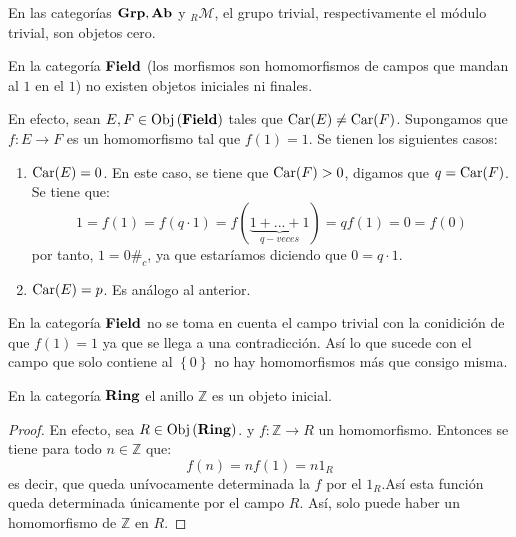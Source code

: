 \documentclass[12pt]{report}
\theoremstyle{largebreak}
\newcommand\cf[3]{\ensuremath{#1:#2\rightarrow#3}}
\newcommand\contradiction{\ensuremath{\#_c}}
\newcommand{\Obj}[1]{\ensuremath{\textup{Obj}\left(#1\right)}}
\newcommand{\Cat}[1]{\ensuremath{\textup{\textbf{#1}}}}
\begin{document}
    \begin{exa}
        En las categorías $\Cat{Grp},\Cat{Ab}$ y $_R\mathcal{M}$, el grupo trivial, respectivamente el módulo trivial, son objetos cero.
    \end{exa}

    \begin{exa}
        En la categoría $\Cat{Field}$ (los morfismos son homomorfismos de campos que mandan al $1$ en el $1$) no existen objetos iniciales ni finales.
    \end{exa}

    \begin{sol}
        En efecto, sean $E,F\in\Obj{\Cat{Field}}$ tales que $\textup{Car}(E)\neq\textup{Car}(F)$. Supongamos que $\cf{f}{E}{F}$ es un homomorfismo tal que $f(1)=1$. Se tienen los siguientes casos:
        \begin{enumerate}
            \item $\textup{Car}(E)=0$. En este caso, se tiene que $\textup{Car}(F)>0$, digamos que $q=\textup{Car}(F)$. Se tiene que:
            \begin{equation*}
                1=f(1)=f(q\cdot 1)=f(\underbrace{1+...+1}_{q-veces})=qf(1)=0=f(0)
            \end{equation*}
            por tanto, $1=0$\contradiction, ya que estaríamos diciendo que $0=q\cdot 1$.
            \item $\textup{Car}(E)=p$. Es análogo al anterior.
        \end{enumerate}
    \end{sol}

    \begin{obs}
        En la categoría $\Cat{Field}$ no se toma en cuenta el campo trivial con la conidición de que $f(1)=1$ ya que se llega a una contradicción. Así lo que sucede con el campo que solo contiene al $\left\{0\right\}$ no hay homomorfismos más que consigo misma.
    \end{obs}

    \begin{exa}
        En la categoría $\Cat{Ring}$ el anillo $\mathbb{Z}$ es un objeto inicial.
    \end{exa}

    \begin{proof}
        En efecto, sea $R\in\Obj{\Cat{Ring}}$. y $\cf{f}{\mathbb{Z}}{R}$ un homomorfismo. Entonces se tiene para todo $n\in\mathbb{Z}$ que:
        \begin{equation*}
            f(n)=nf(1)=n1_R
        \end{equation*}
        es decir, que queda unívocamente determinada la $f$ por el $1_R$.Así esta función queda determinada únicamente por el campo $R$. Así, solo puede haber un homomorfismo de $\mathbb{Z}$ en $R$.
    \end{proof}
\end{document}
